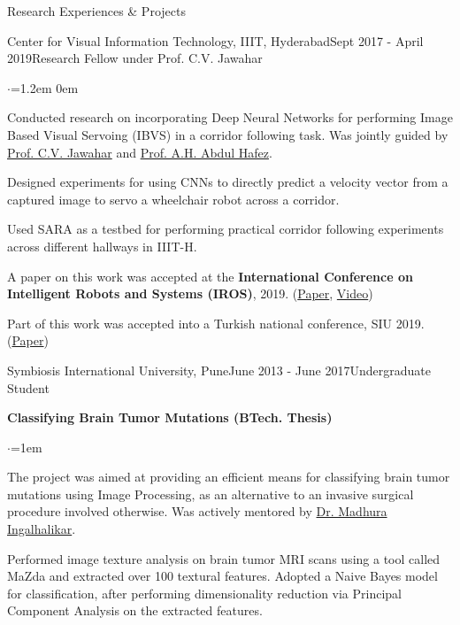 \documentclass{resume}
\begin{document}
\begin{rSection}{Research Experiences \& Projects}
\begin{rSubsection}{Center for Visual Information Technology, IIIT, Hyderabad}{Sept 2017 - April 2019}{Research Fellow under Prof. C.V. Jawahar}{}
\vspace*{-0.2em}
\begin{list}{$\cdot$}{\leftmargin=1.2em}
\itemsep0em 
\item Conducted research on incorporating Deep Neural Networks for performing Image Based Visual Servoing (IBVS) in a corridor following task. Was jointly guided by \href{https://scholar.google.com/citations?user=U9dH-DoAAAAJ&hl=en}{Prof. C.V. Jawahar} and \href{https://scholar.google.com/citations?user=81UGxdYAAAAJ&hl=en}{Prof. A.H. Abdul Hafez}.
\item Designed experiments for using CNNs to directly predict a velocity vector from a captured image to servo a wheelchair robot across a corridor.
\item Used SARA as a testbed for performing practical corridor following experiments across different hallways in IIIT-H.
\item A paper on this work was accepted at the \textbf{International Conference on Intelligent Robots and Systems (IROS)}, 2019.
\hfill
(\href{https://vdorbala.github.io/pdf/IROS_paper.pdf}{Paper}, \href{https://vdorbala.github.io/pdf/IROS_video.mp4}{Video})
\item Part of this work was accepted into a Turkish national conference, SIU 2019.
\hfill
(\href{https://vdorbala.github.io/pdf/SIU2019.pdf}{Paper})
\end{list}
\hfill
\end{rSubsection}
\begin{rSubsection}{Symbiosis International University, Pune}{June 2013 - June 2017}{Undergraduate Student}{}
\item

{\textbullet \hspace{0.1em} \textbf{Classifying Brain Tumor Mutations (BTech. Thesis)}}

\vspace*{-0.2em}
\begin{list}{$\cdot$}{\leftmargin=1em}
\item The project was aimed at providing an efficient means for classifying brain tumor mutations using Image Processing, as an alternative to an invasive surgical procedure involved otherwise. Was actively mentored by \href{https://scholar.google.com/citations?hl=en&user=UdKti2kAAAAJ&view_op=list_works&sortby=pubdate}{Dr. Madhura Ingalhalikar}.
\item Performed image texture analysis on brain tumor MRI scans using a tool called MaZda and extracted over 100 textural features. Adopted a Naive Bayes model for classification, after performing dimensionality reduction via Principal Component Analysis on the extracted features.
\end{list}


\end{rSubsection}
\end{rSection}
\end{document}
